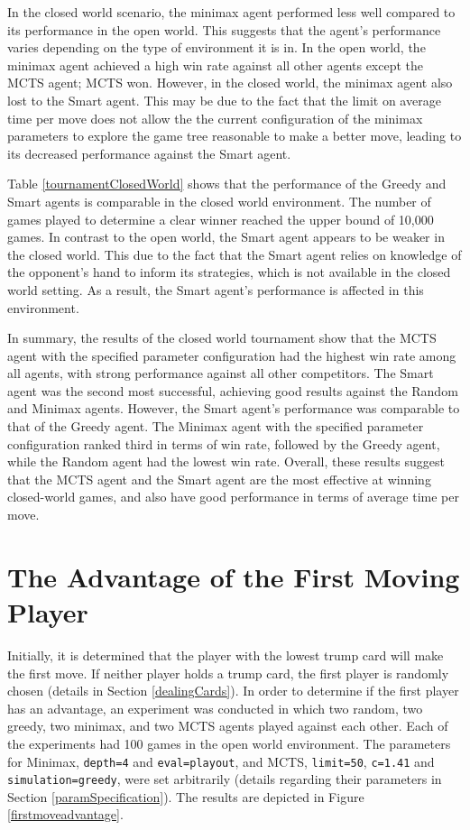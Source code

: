 In the closed world scenario, the minimax agent performed less well compared to its performance in the open world. This suggests that the agent's performance varies depending on the type of environment it is in. In the open world, the minimax agent achieved a high win rate against all other agents except the MCTS agent; MCTS won. However, in the closed world, the minimax agent also lost to the Smart agent. This may be due to the fact that the limit on average time per move does not allow the the current configuration of the minimax parameters to explore the game tree reasonable to make a better move, leading to its decreased performance against the Smart agent.

Table \ref{tournamentClosedWorld} shows that the performance of the Greedy and Smart agents is comparable in the closed world environment. The number of games played to determine a clear winner reached the upper bound of 10,000 games. In contrast to the open world, the Smart agent appears to be weaker in the closed world. This  due to the fact that the Smart agent relies on knowledge of the opponent's hand to inform its strategies, which is not available in the closed world setting. As a result, the Smart agent's performance is affected in this environment.

In summary, the results of the closed world tournament show that the MCTS agent with the specified parameter configuration had the highest win rate among all agents, with strong performance against all other competitors. The Smart agent was the second most successful, achieving good results against the Random and Minimax agents. However, the Smart agent's performance was comparable to that of the Greedy agent. The Minimax agent with the specified parameter configuration ranked third in terms of win rate, followed by the Greedy agent, while the Random agent had the lowest win rate. Overall, these results suggest that the MCTS agent and the Smart agent are the most effective at winning closed-world games, and also have good performance in terms of average time per move.

\section{The Advantage of the First Moving Player}

Initially, it is determined that the player with the lowest trump card will make the first move. If neither player holds a trump card, the first player is randomly chosen (details in Section \ref{dealingCards}). In order to determine if the first player has an advantage, an experiment was conducted in which two random, two greedy, two minimax, and two MCTS agents played against each other. Each of the experiments had 100 games in the open world environment. The parameters for Minimax, \texttt{depth=4} and \texttt{eval=playout}, and MCTS, \texttt{limit=50}, \texttt{c=1.41} and \texttt{simulation=greedy}, were set arbitrarily (details regarding their parameters in Section \ref{paramSpecification}). The results are depicted in Figure \ref{firstmoveadvantage}.

